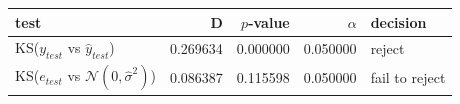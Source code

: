 \begin{tabular}{lrrrl}
\toprule
test & D & $p$-value & $\alpha$ & decision \\
\midrule
KS($y_{test}$ vs $\hat{y}_{test}$) & 0.269634 & 0.000000 & 0.050000 & reject \\
KS($e_{test}$ vs $\mathcal{N}(0,\hat{\sigma}^2)$) & 0.086387 & 0.115598 & 0.050000 & fail to reject \\
\bottomrule
\end{tabular}
